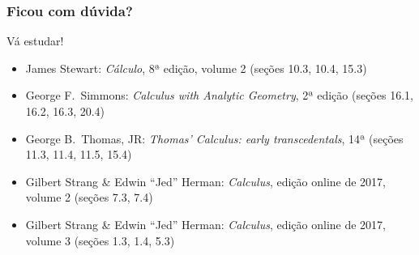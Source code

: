 \documentclass[pdftex, brazil, aspectratio=169]{beamer}
\begin{document}
\begin{frame}
\frametitle{Ficou com dúvida?}
\begin{center}
  \Huge Vá estudar!
  \vspace{1.6cm}
  \normalsize
  \begin{itemize}
    \item James Stewart: \emph{Cálculo}, 8ª edição, volume 2 (seções
      10.3, 10.4, 15.3)
    \item George F.\ Simmons: \emph{Calculus with Analytic Geometry},
      2ª edição (seções 16.1, 16.2, 16.3, 20.4)
    \item George B.\ Thomas, JR: \emph{Thomas' Calculus: early
      transcedentals}, 14ª (seções 11.3, 11.4, 11.5, 15.4)
    \item Gilbert Strang \& Edwin ``Jed'' Herman: \emph{Calculus},
      edição online de 2017, volume 2 (seções 7.3, 7.4)
    \item Gilbert Strang \& Edwin ``Jed'' Herman: \emph{Calculus},
      edição online de 2017, volume 3 (seções 1.3, 1.4, 5.3)
  \end{itemize}
\end{center}
\end{frame}


\end{document}
